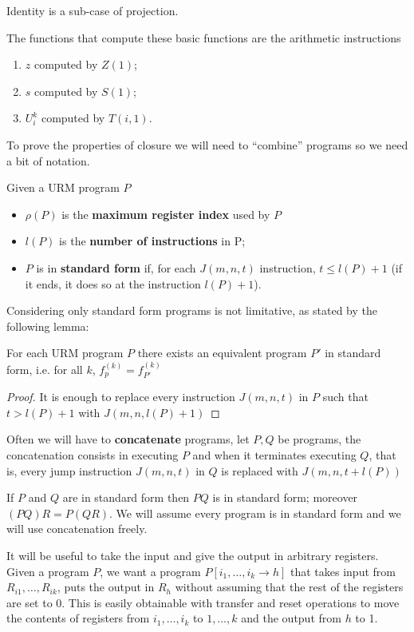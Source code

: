 \begin{remark}
  Identity is a sub-case of projection.
\end{remark}


The functions that compute these basic functions are the arithmetic instructions
\begin{enumerate}
\item $z$ computed by $Z(1)$;
\item $s$ computed by $S(1)$;
\item $U_i^k$ computed by $T(i, 1)$.
\end{enumerate}

To prove the properties of closure we will need to ``combine'' programs so we need a bit of notation.
\begin{notation}
  Given a URM program $P$
  \begin{itemize}
    \item $\rho(P)$ is the \textbf{maximum register index} used by $P$
    \item $ l(P) $ is the \textbf{number of instructions} in P;
    \item $P$ is in \textbf{standard form} if, for each $J(m,n,t)$ instruction, $t\leq l(P)+1$ (if it ends, it does so at the instruction $l(P)+1$).
  \end{itemize}
\end{notation}



Considering only standard form programs is not limitative, as stated by the following lemma:
\begin{lemma}
  For each URM program $P$ there exists an equivalent program $P'$ in standard form, i.e. for all $ k$, $f_p^{(k)} = f_{P'}^{(k)}$
\begin{proof} It is enough to replace every instruction $J(m,n,t)$ in $P$ such that $t>l(P)+1$ with $J(m,n,l(P)+1)$
\end{proof}
\end{lemma}

Often we will have to \textbf{concatenate} programs, let $P, Q$ be programs, 
the concatenation consists in executing $P$ and when it terminates executing $Q$, 
that is, every jump instruction $J(m,n,t)$ in $Q$ is replaced with $J(m,n,t+l(P))$

\begin{remark}
  If $P$ and $Q$ are in standard form then $PQ$ is in standard form; moreover $(PQ)R = P(QR)$. We will assume every program is in standard form and we will use concatenation freely.
\end{remark} 
It will be useful to take the input and give the output in arbitrary registers. 
Given a program $P$, we want a program $P[i_1,\dots,i_k \rightarrow h]$ that takes input from $R_{i1},\dots,R_{ik}$, puts the output in $ R_h $ without assuming that the rest of the registers are set to 0. 
This is easily obtainable with transfer and reset operations to move the contents of registers from $i_1,\dots,i_k$ to $1,\dots,k$ and the output from $h$ to 1.

